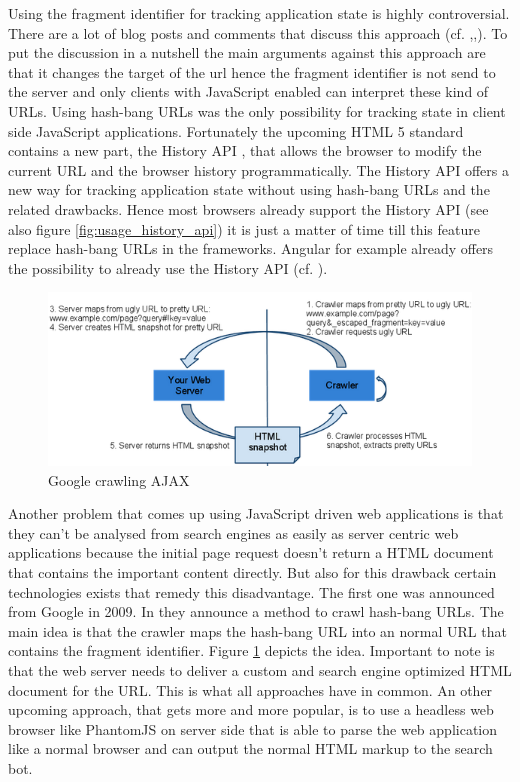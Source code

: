 Using the fragment identifier for tracking application state is highly controversial.
There are a lot of blog posts and comments that discuss this approach (cf.
\autocite[]{hashbang_urls_1},\autocite[]{hashbang_urls_2},\autocite[]{hashbang_urls_3}).
To put the discussion in a nutshell the main arguments against this approach are that it changes the target of the url hence the fragment identifier is not send to the server and only clients with JavaScript enabled can interpret these kind of URLs.
Using hash-bang URLs was the only possibility for tracking state in client side JavaScript applications.
Fortunately the upcoming HTML 5 standard contains a new part, the History API \autocite[]{w3c-history-api}, that allows the browser to modify the current URL and the browser history programmatically.
The History API offers a new way for tracking application state without using hash-bang URLs and the related drawbacks.
Hence most browsers already support the History API (see also figure \ref{fig:usage_history_api}) it is just a matter of time till this feature replace hash-bang URLs in the frameworks.
Angular for example already offers the possibility to already use the History API (cf.
\autocite[]{angular_location}).

\begin{figure}
	\centering \includegraphics[width=1.0\textwidth]{./img/web-dev/google_crawling_hashbang.png}
	\caption{Google crawling AJAX \autocite{google_AJAX_crawling}}
	\label{fig:google_crawling_ajax}
\end{figure}

Another problem that comes up using JavaScript driven web applications is that they can't be analysed from search engines as easily as server centric web applications because the initial page request doesn't return a HTML document that contains the important content directly.
But also for this drawback certain technologies exists that remedy this disadvantage.
The first one was announced from Google in 2009.
In \autocite[]{google_AJAX_crawling} they announce a method to crawl hash-bang URLs.
The main idea is that the crawler maps the hash-bang URL into an normal URL that contains the fragment identifier.
Figure \ref{fig:google_crawling_ajax} depicts the idea.
Important to note is that the web server needs to deliver a custom and search engine optimized HTML document for the URL.
This is what all approaches have in common.
An other upcoming approach, that gets more and more popular, is to use a headless web browser like PhantomJS on server side that is able to parse the web application like a normal browser and can output the normal HTML markup to the search bot.